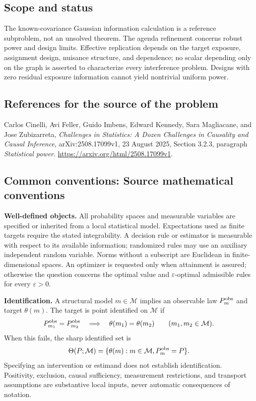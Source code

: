 \documentclass[11pt,a4paper]{article}
\begin{document}
\subsection*{Scope and status}
The known-covariance Gaussian information calculation is a reference subproblem, not an unsolved theorem. The agenda refinement concerns robust power and design limits. Effective replication depends on the target exposure, assignment design, nuisance structure, and dependence; no scalar depending only on the graph is asserted to characterize every interference problem. Designs with zero residual exposure information cannot yield nontrivial uniform power.
\subsection*{References for the source of the problem}
Carlos Cinelli, Avi Feller, Guido Imbens, Edward Kennedy, Sara Magliacane, and Jose Zubizarreta, \emph{Challenges in Statistics: A Dozen Challenges in Causality and Causal Inference}, arXiv:2508.17099v1, 23 August 2025, Section 3.2.3, paragraph \emph{Statistical power}. \url{https://arxiv.org/html/2508.17099v1}.

\subsection*{Common conventions: Source mathematical conventions}

\textbf{Well-defined objects.}
All probability spaces and measurable variables are specified or inherited
from a local statistical model. Expectations used as finite targets require
the stated integrability. A decision rule or estimator is measurable with
respect to its available information; randomized rules may use an auxiliary
independent random variable. Norms without a subscript are Euclidean in
finite-dimensional spaces. An optimizer is requested only when attainment
is assured; otherwise the question concerns the optimal value and
$\varepsilon$-optimal admissible rules for every $\varepsilon>0$.

\textbf{Identification.}
A structural model $m\in\mathcal M$ implies an observable law
$P_m^{\rm obs}$ and target $\theta(m)$. The target is point identified on
$\mathcal M$ if
\[
 P_{m_1}^{\rm obs}=P_{m_2}^{\rm obs}
 \quad\Longrightarrow\quad\theta(m_1)=\theta(m_2)
 \qquad(m_1,m_2\in\mathcal M).
\]
When this fails, the sharp identified set is
\[
 \Theta(P;\mathcal M)=\{\theta(m):m\in\mathcal M,
                                  P_m^{\rm obs}=P\}.
\]
Specifying an intervention or estimand does not establish identification.
Positivity, exclusion, causal sufficiency, measurement restrictions, and
transport assumptions are substantive local inputs, never automatic
consequences of notation.
\end{document}
